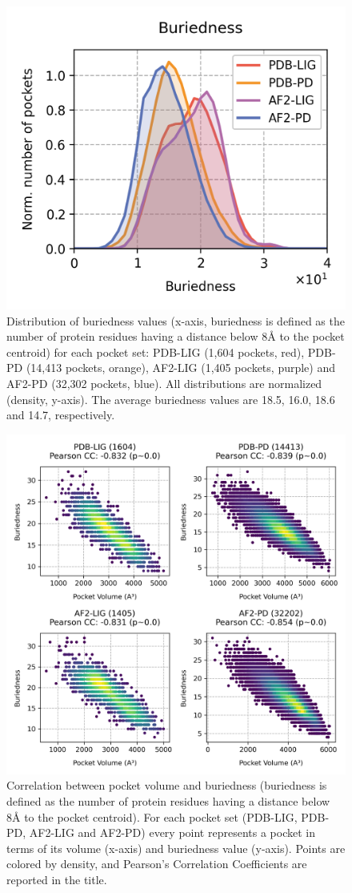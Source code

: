 \begin{figure}[htbp]
  \centering
  \includegraphics[width=0.4\linewidth]{figures/PocketVec/Supplementary/FigS18.png}
  \caption{
  Distribution of buriedness values (x-axis, buriedness is defined as the number of protein residues having a distance below 8Å to the pocket centroid) for each pocket set: PDB-LIG (1,604 pockets, red), PDB-PD (14,413 pockets, orange), AF2-LIG (1,405 pockets, purple) and AF2-PD (32,302 pockets, blue). All distributions are normalized (density, y-axis). The average buriedness values are 18.5, 16.0, 18.6 and 14.7, respectively.    
  }
  \label{PocketVec_FigS18}
\end{figure}


\begin{figure}[htbp]
  \centering
  \includegraphics[width=0.6\linewidth]{figures/PocketVec/Supplementary/FigS19.png}
  \caption{
  Correlation between pocket volume and buriedness (buriedness is defined as the number of protein residues having a distance below 8Å to the pocket centroid). For each pocket set (PDB-LIG, PDB-PD, AF2-LIG and AF2-PD) every point represents a pocket in terms of its volume (x-axis) and buriedness value (y-axis). Points are colored by density, and Pearson’s Correlation Coefficients are reported in the title.     
  }
  \label{PocketVec_FigS19}
\end{figure}


